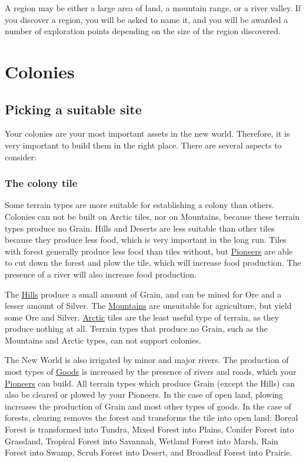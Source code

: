 \documentclass[12pt]{article}
\begin{document}
A region may be either a large area of land, a mountain range, or a
river valley. If you discover a region, you will be asked to name it,
and you will be awarded a number of exploration points depending on
the size of the region discovered.


\hypertarget{Colonies}{\section{Colonies}}

\hypertarget{Picking a suitable site}{\subsection{Picking a suitable site}}

Your colonies are your most important assets in the new world.
Therefore, it is very important to build them in the right
place. There are several aspects to consider:

\hypertarget{The colony tile}{\subsubsection{The colony tile}}

Some terrain types are more suitable for establishing a colony than
others. Colonies can not be built on Arctic tiles, nor on Mountains,
because these terrain types produce no Grain. Hills and Deserts are
less suitable than other tiles because they produce less food, which
is very important in the long run. Tiles with forest generally produce
less food than tiles without, but \hyperlink{Pioneer}{Pioneers} are
able to cut down the forest and plow the tile, which will increase
food production. The presence of a river will also increase food
production.

The \hyperlink{Hills}{Hills} produce a small amount of Grain, and can
be mined for Ore and a lesser amount of Silver. The
\hyperlink{Mountains}{Mountains} are unsuitable for agriculture, but
yield some Ore and Silver. \hyperlink{Arctic}{Arctic} tiles are the
least useful type of terrain, as they produce nothing at all. Terrain
types that produce no Grain, such as the Mountains and Arctic types,
can not support colonies.

The New World is also irrigated by minor and major rivers. The
production of most types of \hyperlink{Goods}{Goods} is increased by
the presence of rivers and roads, which your
\hyperlink{Pioneer}{Pioneers} can build. All terrain types which
produce Grain (except the Hills) can also be cleared or plowed by your
Pioneers. In the case of open land, plowing increases the production
of Grain and most other types of goods. In the case of forests,
clearing removes the forest and transforms the tile into open land:
Boreal Forest is transformed into Tundra, Mixed Forest into Plains,
Conifer Forest into Grassland, Tropical Forest into Savannah, Wetland
Forest into Marsh, Rain Forest into Swamp, Scrub Forest into Desert,
and Broadleaf Forest into Prairie.
\end{document}
